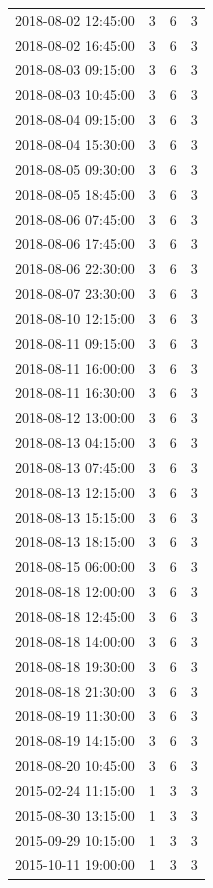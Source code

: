 \begin{tabular}{lrrr}
2018-08-02 12:45:00 & 3 & 6 & 3 \\
2018-08-02 16:45:00 & 3 & 6 & 3 \\
2018-08-03 09:15:00 & 3 & 6 & 3 \\
2018-08-03 10:45:00 & 3 & 6 & 3 \\
2018-08-04 09:15:00 & 3 & 6 & 3 \\
2018-08-04 15:30:00 & 3 & 6 & 3 \\
2018-08-05 09:30:00 & 3 & 6 & 3 \\
2018-08-05 18:45:00 & 3 & 6 & 3 \\
2018-08-06 07:45:00 & 3 & 6 & 3 \\
2018-08-06 17:45:00 & 3 & 6 & 3 \\
2018-08-06 22:30:00 & 3 & 6 & 3 \\
2018-08-07 23:30:00 & 3 & 6 & 3 \\
2018-08-10 12:15:00 & 3 & 6 & 3 \\
2018-08-11 09:15:00 & 3 & 6 & 3 \\
2018-08-11 16:00:00 & 3 & 6 & 3 \\
2018-08-11 16:30:00 & 3 & 6 & 3 \\
2018-08-12 13:00:00 & 3 & 6 & 3 \\
2018-08-13 04:15:00 & 3 & 6 & 3 \\
2018-08-13 07:45:00 & 3 & 6 & 3 \\
2018-08-13 12:15:00 & 3 & 6 & 3 \\
2018-08-13 15:15:00 & 3 & 6 & 3 \\
2018-08-13 18:15:00 & 3 & 6 & 3 \\
2018-08-15 06:00:00 & 3 & 6 & 3 \\
2018-08-18 12:00:00 & 3 & 6 & 3 \\
2018-08-18 12:45:00 & 3 & 6 & 3 \\
2018-08-18 14:00:00 & 3 & 6 & 3 \\
2018-08-18 19:30:00 & 3 & 6 & 3 \\
2018-08-18 21:30:00 & 3 & 6 & 3 \\
2018-08-19 11:30:00 & 3 & 6 & 3 \\
2018-08-19 14:15:00 & 3 & 6 & 3 \\
2018-08-20 10:45:00 & 3 & 6 & 3 \\
2015-02-24 11:15:00 & 1 & 3 & 3 \\
2015-08-30 13:15:00 & 1 & 3 & 3 \\
2015-09-29 10:15:00 & 1 & 3 & 3 \\
2015-10-11 19:00:00 & 1 & 3 & 3 \\

\end{tabular}
